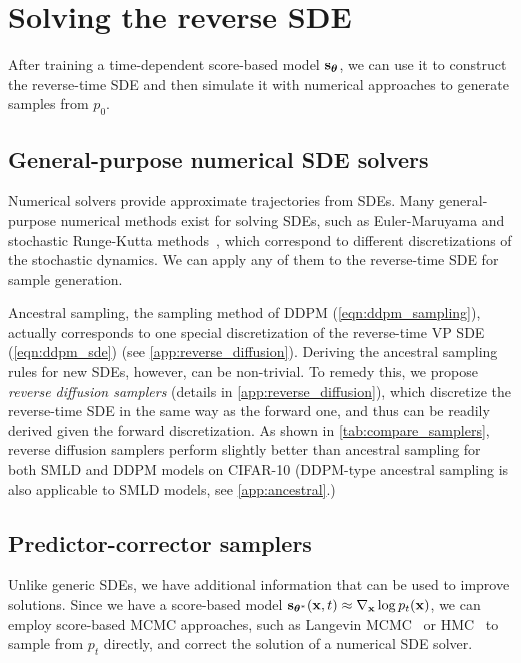 \section{Solving the reverse SDE}
After training a time-dependent score-based model $\mathbf{s}_{\boldsymbol{\theta}}$, we can use it to construct the reverse-time SDE and then simulate it with numerical approaches to generate samples from $p_0$. %

\subsection{General-purpose numerical SDE solvers}

Numerical solvers provide approximate trajectories from SDEs. Many general-purpose numerical methods exist for solving SDEs, such as Euler-Maruyama and stochastic Runge-Kutta methods~\citep{kloeden2013numerical}, which correspond to different discretizations of the stochastic dynamics. We can apply any of them to the reverse-time SDE for sample generation. %

Ancestral sampling, the sampling method of DDPM (\cref{eqn:ddpm_sampling}), actually corresponds to one special discretization of the reverse-time VP SDE (\cref{eqn:ddpm_sde}) (see \cref{app:reverse_diffusion}). Deriving the ancestral sampling rules for new SDEs, however, can be non-trivial. To remedy this, we propose \emph{reverse diffusion samplers} (details in \cref{app:reverse_diffusion}), which discretize the reverse-time SDE in the same way as the forward one, and thus can be readily derived given the forward discretization.
As shown in \cref{tab:compare_samplers}, reverse diffusion samplers perform slightly better than ancestral sampling for both SMLD and DDPM models on CIFAR-10 (DDPM-type ancestral sampling is also applicable to SMLD models, see \cref{app:ancestral}.)


\subsection{Predictor-corrector samplers}
Unlike generic SDEs, we have additional information that can be used to improve solutions. Since we have a score-based model $\mathbf{s}_{{\boldsymbol{\theta}}^*}(\mathbf{x}, t) \approx \nabla_{\mathbf{x}} \log p_t(\mathbf{x})$, we can employ score-based MCMC approaches, such as Langevin MCMC~\citep{parisi1981correlation,grenander1994representations} or HMC~\citep{neal2011mcmc} to sample from $p_t$ directly, and correct the solution of a numerical SDE solver. 


